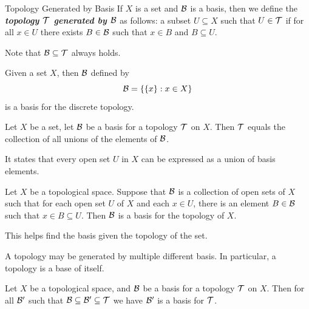 \documentclass[12pt,a4paper]{article}
\begin{document}
    \begin{defi}{Topology Generated by Basis}
        If $X$ is a set and $\mathcal{B}$ is a basis, then we define the \textit{\textbf{topology $\mathcal{T}$ generated by $\mathcal{B}$}} as follows: a subset $U\subseteq X$ such that $U\in\mathcal{T}$ if for all $x\in U$ there exists $B\in\mathcal{B}$ such that $x\in B$ and $B\subseteq U$.
    \end{defi}
    \begin{remark}
        Note that $\mathcal{B}\subseteq\mathcal{T}$ always holds.
    \end{remark}
    \hfill
    
    \begin{eg}
        Given a set $X$, then $\mathcal{B}$ defined by
        $$
        \mathcal{B}=\left\{\left\{x\right\}:x\in X\right\}
        $$
        is a basis for the discrete topology.
    \end{eg}
    \hfill

    \begin{prop}
        Let $X$ be a set, let $\mathcal{B}$ be a basis for a topology $\mathcal{T}$ on $X$. Then $\mathcal{T}$ equals the collection of all unions of the elements of $\mathcal{B}$.
    \end{prop}
    \begin{remark}
        It states that every open set $U$ in $X$ can be expressed as a union of basis elements.
    \end{remark}
    \hfill

    \begin{prop}
        Let $X$ be a topological space. Suppose that $\mathcal{B}$ is a collection of open sets of $X$ such that for each open set $U$ of $X$ and each $x\in U$, there is an element $B\in\mathcal{B}$ such that $x\in B\subseteq U$. Then $\mathcal{B}$ is a basis for the topology of $X$.
    \end{prop}
    \begin{remark}
        This helps find the basis given the topology of the set.
    \end{remark}
    \begin{remark}
        A topology may be generated by multiple different basis. In particular, a topology is a base of itself.
    \end{remark}

    \begin{cor}
        Let $X$ be a topological space, and $\mathcal{B}$ be a basis for a topology $\mathcal{T}$ on $X$. Then for all $\mathcal{B}'$ such that $\mathcal{B}\subseteq\mathcal{B}'\subseteq\mathcal{T}$ we have $\mathcal{B}'$ is a basis for $\mathcal{T}$.
    \end{cor}
    \hfill
\end{document}

